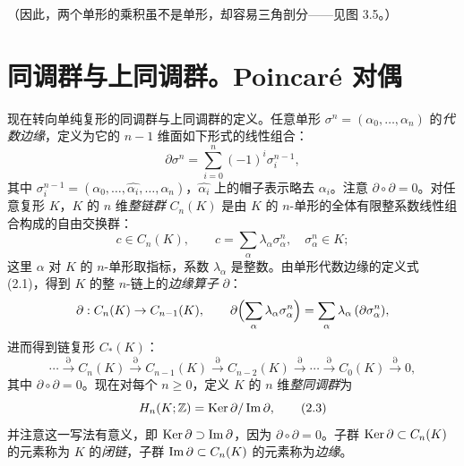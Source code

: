 （因此，两个单形的乘积虽不是单形，却容易三角剖分——见图 3.5。）

\section{同调群与上同调群。Poincaré 对偶}

现在转向单纯复形的同调群与上同调群的定义。任意单形 $\sigma^n=(\alpha_0,\dots,\alpha_n)$ 的\emph{代数边缘}，定义为它的 $n-1$ 维面如下形式的线性组合：
\begin{equation}
  \partial\sigma^n=\sum_{i=0}^{n}(-1)^i\sigma_i^{n-1}, \tag{2.1}
\end{equation}
其中 $\sigma_i^{n-1}=(\alpha_0,\dots,\widehat{\alpha_i},\dots,\alpha_n)$，$\widehat{\alpha_i}$ 上的帽子表示略去 $\alpha_i$。注意 $\partial\circ\partial=0$。对任意复形 $K$，$K$ 的 $n$ 维\emph{整链群} $C_n(K)$ 是由 $K$ 的 $n$-单形的全体有限整系数线性组合构成的自由交换群：
\[
  c\in C_n(K),\qquad c=\sum_{\alpha}\lambda_{\alpha}\sigma_{\alpha}^{n},\quad \sigma_{\alpha}^{n}\in K;
\]
这里 $\alpha$ 对 $K$ 的 $n$-单形取指标，系数 $\lambda_{\alpha}$ 是整数。由单形代数边缘的定义式 (2.1)，得到 $K$ 的整 $n$-链上的\emph{边缘算子} $\partial$：
\[
  \partial: C_n(K)\to C_{n-1}(K),\qquad
  \partial\Bigl(\sum_{\alpha}\lambda_{\alpha}\sigma_{\alpha}^{n}\Bigr)
  =\sum_{\alpha}\lambda_{\alpha}\,(\partial\sigma_{\alpha}^{n}),
\]
进而得到链复形 $C_*(K)$：
\begin{equation}
  \cdots\xrightarrow{\partial}C_n(K)\xrightarrow{\partial}C_{n-1}(K)
  \xrightarrow{\partial}C_{n-2}(K)\xrightarrow{\partial}\cdots
  \xrightarrow{\partial}C_0(K)\xrightarrow{\partial}0, \tag{2.2}
\end{equation}
其中 $\partial\circ\partial=0$。现在对每个 $n\ge 0$，定义 $K$ 的 $n$ 维\emph{整同调群}为
\begin{equation}
  H_n(K;\mathbb{Z})=\operatorname{Ker}\partial/\operatorname{Im}\partial, \tag{2.3}
\end{equation}
并注意这一写法有意义，即 $\operatorname{Ker}\partial\supset\operatorname{Im}\partial$，因为 $\partial\circ\partial=0$。子群 $\operatorname{Ker}\partial\subset C_n(K)$ 的元素称为 $K$ 的\emph{闭链}，子群 $\operatorname{Im}\partial\subset C_n(K)$ 的元素称为\emph{边缘}。

